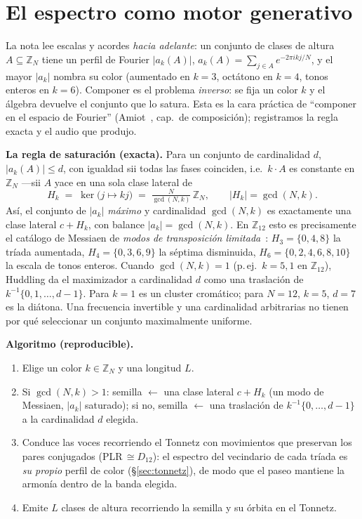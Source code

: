 \documentclass[11pt]{article}
\newcommand{\Zn}[1]{\mathbb{Z}_{#1}}
\begin{document}
\appendix
\section{El espectro como motor generativo}
\label{app:compose}

La nota lee escalas y acordes \emph{hacia adelante}: un conjunto de clases de altura $A\subseteq\Zn{N}$
tiene un perfil de Fourier $|a_k(A)|$, $a_k(A)=\sum_{j\in A}e^{-2\pi i kj/N}$, y el mayor $|a_k|$ nombra su
color (aumentado en $k{=}3$, oct\'atono en $k{=}4$, tonos enteros en $k{=}6$). Componer es el problema
\emph{inverso}: se fija un color $k$ y el \'algebra devuelve el conjunto que lo satura. Esta es la cara
pr\'actica de ``componer en el espacio de Fourier'' (Amiot~\cite{Amiot}, cap.\ de composici\'on);
registramos la regla exacta y el audio que produjo.

\textbf{La regla de saturaci\'on (exacta).} Para un conjunto de cardinalidad $d$, $|a_k(A)|\le d$, con
igualdad sii todas las fases coinciden, i.e.\ $k\!\cdot\!A$ es constante en $\Zn{N}$ ---sii $A$ yace en una
sola clase lateral de
\[
  H_k \;=\; \ker\bigl(j\mapsto kj\bigr) \;=\; \tfrac{N}{\gcd(N,k)}\,\Zn{N},
  \qquad |H_k|=\gcd(N,k).
\]
As\'i, el conjunto de $|a_k|$ \emph{m\'aximo} y cardinalidad $\gcd(N,k)$ es exactamente una clase lateral
$c+H_k$, con balance $|a_k|=\gcd(N,k)$. En $\Zn{12}$ esto es precisamente el cat\'alogo de Messiaen de
\emph{modos de transposici\'on limitada}~\cite{Messiaen}: $H_3=\{0,4,8\}$ la tr\'iada aumentada,
$H_4=\{0,3,6,9\}$ la s\'eptima disminuida, $H_6=\{0,2,4,6,8,10\}$ la escala de tonos enteros. Cuando
$\gcd(N,k)=1$ (p.\,ej.\ $k{=}5,1$ en $\Zn{12}$), Huddling da el maximizador a cardinalidad $d$
como una traslaci\'on de $k^{-1}\{0,1,\ldots,d-1\}$. Para $k=1$ es un cluster crom\'atico;
para $N=12$, $k=5$, $d=7$ es la di\'atona. Una frecuencia invertible y una cardinalidad
arbitrarias no tienen por qu\'e seleccionar un conjunto maximalmente uniforme.

\textbf{Algoritmo (reproducible).}
\begin{enumerate}\setlength\itemsep{0pt}
  \item Elige un color $k\in\Zn{N}$ y una longitud $L$.
  \item Si $\gcd(N,k)>1$: semilla $\leftarrow$ una clase lateral $c+H_k$ (un modo de Messiaen, $|a_k|$
        saturado); si no, semilla $\leftarrow$ una traslaci\'on de $k^{-1}\{0,\ldots,d-1\}$ a la cardinalidad $d$ elegida.
  \item Conduce las voces recorriendo el Tonnetz con movimientos que preservan los pares conjugados
        (PLR$\,\cong D_{12}$): el espectro del vecindario de cada tr\'iada es \emph{su propio} perfil de
        color (\S\ref{sec:tonnetz}), de modo que el paseo mantiene la armon\'ia dentro de la banda elegida.
  \item Emite $L$ clases de altura recorriendo la semilla y su \'orbita en el Tonnetz.
\end{enumerate}
\end{document}
